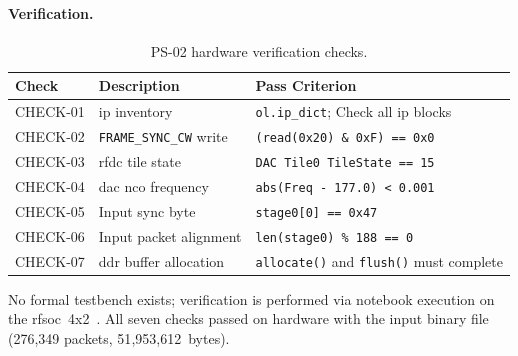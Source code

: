 \paragraph{Verification.}
\leavevmode\par
\begin{table}[!h]
  \caption{PS-02 hardware verification checks.}
  \label{tab:ps02_checks}
  \centering
  \small
  \begin{tabular}{l p{4.8cm} p{7.5cm}}
    \hline
    Check & Description & Pass Criterion \\
    \hline
    CHECK-01
      & \ac{ip} inventory
      & \texttt{ol.ip\_dict}; Check all \ac{ip} blocks\\[2pt]
    CHECK-02
      & \texttt{FRAME\_SYNC\_CW} write
      & \texttt{(read(0x20)~\&~0xF)~==~0x0} \\[2pt]
    CHECK-03
      & \ac{rfdc} tile state
      & \texttt{DAC Tile0 TileState~==~15} \\[2pt]
    CHECK-04
      & \ac{dac} \ac{nco} frequency
      & \texttt{abs(Freq - 177.0)~<~0.001} \\[2pt]
    CHECK-05
      & Input sync byte
      & \texttt{stage0[0]~==~0x47} \\[2pt]
    CHECK-06
      & Input packet alignment
      & \texttt{len(stage0)~\%~188~==~0} \\[2pt]
    CHECK-07
      & \ac{ddr} buffer allocation
      & \texttt{allocate()} and \texttt{flush()} must complete\\
    \hline
  \end{tabular}
\end{table}
\FloatBarrier

No formal testbench exists; verification is performed via notebook
execution on the \ac{rfsoc}~4x2~\cite{PYNQ_DOC}.
All seven checks passed on hardware with the input binary file
(276{,}349 packets, 51{,}953{,}612~bytes).



